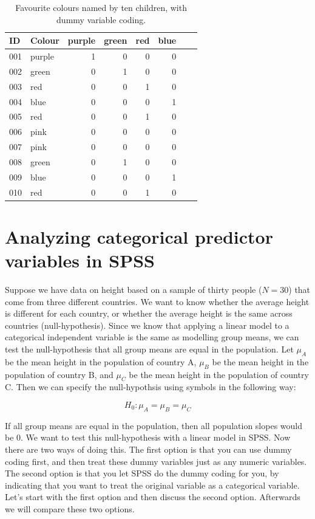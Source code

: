 \documentclass[]{book}\usepackage[]{graphicx}\usepackage[]{color}
\begin{document}
\begin{table}
\caption{Favourite colours named by ten children, with dummy variable coding.}
 \begin{tabular}{llrrrrrr}
 ID & Colour &  purple &green&red&blue&&\\ \hline
  001 &purple & 1&0&0&0&\\
  002 &green &  0&1&0&0&\\
  003 &red & 0&0&1&0&\\
  004 &blue &  0&0&0&1&\\
  005 &red & 0&0&1&0&\\
  006 &pink &  0&0&0&0&\\
  007 &pink &  0&0&0&0&\\
  008 &green &  0&1&0&0&\\
  009 &blue &  0&0&0&1&\\
  010 &red &  0&0&1&0&\\
 \end{tabular}
 \label{tab:coloursexample}
 \end{table}





\section{Analyzing categorical predictor variables in SPSS}

Suppose we have data on height based on a sample of thirty people ($N=30$) that come from three different countries. We want to know whether the average height is different for each country, or whether the average height is the same across countries (null-hypothesis). Since we know that applying a linear model to a categorical independent variable is the same as modelling group means, we can test the null-hypothesis that all group means are equal in the population. Let $\mu_A$ be the mean height in the population of country A, $\mu_B$ be the mean height in the population of country B, and $\mu_C$ be the mean height in the population of country C. Then we can specify the null-hypothsis using symbols in the following way:

\begin{equation}
H_0: \mu_A= \mu_B=\mu_C
\end{equation}

If all group means are equal in the population, then all population slopes would be 0. We want to test this null-hypothesis with a linear model in SPSS. Now there are two ways of doing this. The first option is that you can use dummy coding first, and then treat these dummy variables just as any numeric variables. The second option is that you let SPSS do the dummy coding for you, by indicating that you want to treat the original variable as a categorical variable. Let's start with the first option and then discuss the second option. Afterwards we will compare these two options.
\end{document}
